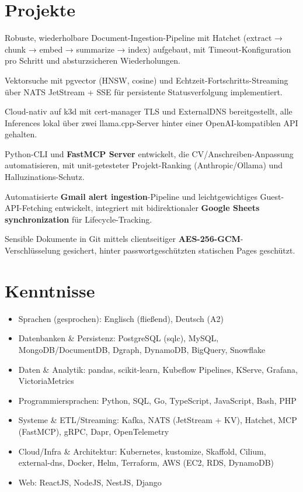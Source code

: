 \documentclass[10pt,a4paper]{resume}
\begin{document}
\section{Projekte}

\bullets
  \item Robuste, wiederholbare Document-Ingestion-Pipeline mit Hatchet (extract → chunk → embed → summarize → index) aufgebaut, mit Timeout-Konfiguration pro Schritt und absturzsicheren Wiederholungen.
  \item Vektorsuche mit pgvector (HNSW, cosine) und Echtzeit-Fortschritts-Streaming über NATS JetStream + SSE für persistente Statusverfolgung implementiert.
  \item Cloud-nativ auf k3d mit cert-manager TLS und ExternalDNS bereitgestellt, alle Inferences lokal über zwei llama.cpp-Server hinter einer OpenAI-kompatiblen API gehalten.
\bulletsend
\vspace{1.0pt}
\bullets
  \item Python-CLI und \textbf{FastMCP Server} entwickelt, die CV/Anschreiben-Anpassung automatisieren, mit unit-getesteter Projekt-Ranking (Anthropic/Ollama) und Halluzinations-Schutz.
  \item Automatisierte \textbf{Gmail alert ingestion}-Pipeline und leichtgewichtiges Guest-API-Fetching entwickelt, integriert mit bidirektionaler \textbf{Google Sheets synchronization} für Lifecycle-Tracking.
  \item Sensible Dokumente in Git mittels clientseitiger \textbf{AES-256-GCM}-Verschlüsselung gesichert, hinter passwortgeschützten statischen Pages geschützt.
\bulletsend

\section{Kenntnisse}

\begin{itemize}[leftmargin=1.4em,nosep,topsep=2pt]
  \item Sprachen (gesprochen): Englisch (fließend), Deutsch (A2)
  \item Datenbanken \& Persistenz: PostgreSQL (sqlc), MySQL, MongoDB/DocumentDB, Dgraph, DynamoDB, BigQuery, Snowflake
  \item Daten \& Analytik: pandas, scikit-learn, Kubeflow Pipelines, KServe, Grafana, VictoriaMetrics
  \item Programmiersprachen: Python, SQL, Go, TypeScript, JavaScript, Bash, PHP
  \item Systeme \& ETL/Streaming: Kafka, NATS (JetStream + KV), Hatchet, MCP (FastMCP), gRPC, Dapr, OpenTelemetry
  \item Cloud/Infra \& Architektur: Kubernetes, kustomize, Skaffold, Cilium, external-dns, Docker, Helm, Terraform, AWS (EC2, RDS, DynamoDB)
  \item Web: ReactJS, NodeJS, NestJS, Django
\end{itemize}
\end{document}
